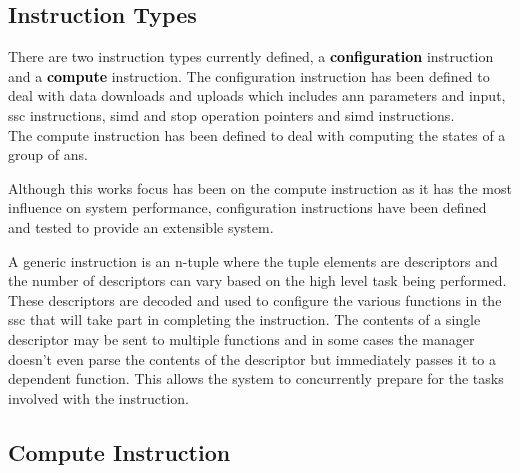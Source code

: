 \subsection{Instruction Types}
\label{sec:Instruction Types}
There are two instruction types currently defined, a \textbf{{\textcolor{black}{configuration}}} instruction and a \textbf{\textcolor{black}{compute}} instruction.
The configuration instruction has been defined to deal with data downloads and uploads which includes \ac{ann} parameters and input, \ac{ssc} instructions, \ac{simd} and \ac{stop} operation pointers and \ac{simd} instructions.\\
The compute instruction has been defined to deal with computing the states of a group of \acp{an}. \par
Although this works focus has been on the compute instruction as it has the most influence on system performance, configuration instructions have been defined and tested to provide an extensible system.
\iffalse
\begin{outline}
  \lbbcleanspace
   \1 \ac{ann} parameters and input
   \1 \ac{ssc} instructions
   \1 \ac{simd} and \ac{stop} operation pointers
   \1 \ac{simd} instructions
\end{outline}
Typically an instruction contains information to process a group of \acp{an} but there are other instruction types to synchronize.
A group can be anywhere from one to 32 \acp{an} and is based on the number of execution lanes in the \ac{ssc} (see section \ref{sec:Processing a group of ANes}) and how the user partitions the \ac{ann} across the available \acp{ssc}.
\fi

A generic instruction is an n-tuple where the tuple elements are descriptors and the number of descriptors can vary based on the high level task being performed. 
These descriptors are decoded and used to configure the various functions in the \ac{ssc} that will take part in completing the instruction. 
The contents of a single descriptor may be sent to multiple functions and in some cases the manager doesn't even parse the contents of the descriptor but immediately passes it to a dependent function.
This allows the system to concurrently prepare for the tasks involved with the instruction.


\subsection{Compute Instruction}
\label{sec:Compute Instruction}

